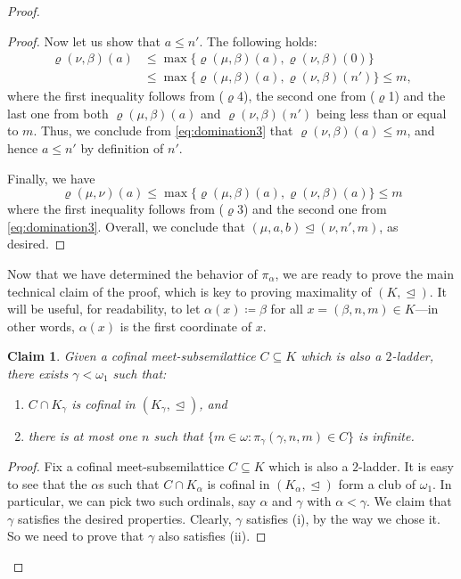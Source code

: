 \documentclass[]{amsart}
\newtheorem{claim}{Claim}[theorem]
\theoremstyle{definition}
\theoremstyle{remark}
\begin{document}
\begin{proof}
\begin{proof}
Now let us show that $a \le n'$. The following holds:
\begin{equation}\label{eq:domination3}
\begin{split}
\varrho(\nu, \beta)(a) &\le \max \{\varrho(\mu, \beta)(a), \varrho(\nu, \beta)(0)\}\\&\le \max \{\varrho(\mu, \beta)(a), \varrho(\nu, \beta)(n')\} \le m,
\end{split}
\end{equation}
where the first inequality follows from ($\varrho$4), the second one from ($\varrho$1) and the last one from both $\varrho(\mu, \beta)(a)$ and $\varrho(\nu, \beta)(n')$ being less than or equal to $m$.
Thus, we conclude from \eqref{eq:domination3} that $\varrho(\nu, \beta)(a) \le m$, and hence $a \le n'$ by definition of $n'$. 

Finally, we have
\[
\varrho(\mu, \nu)(a) \le \max \{\varrho(\mu, \beta)(a), \varrho(\nu, \beta)(a)\} \le m
\]
where the first inequality follows from ($\varrho$3) and the second one from \eqref{eq:domination3}. Overall, we conclude that $(\mu, a, b) \trianglelefteq (\nu, n', m)$, as desired.
\end{proof}

Now that we have determined the behavior of $\pi_\alpha$, we are ready to prove the main technical claim of the proof, which is key to proving maximality of $(K, \trianglelefteq)$. It will be useful, for readability, to let $\alpha(x) \coloneqq \beta$ for all $x = (\beta, n, m) \in K$---in other words, $\alpha(x)$ is the first coordinate of $x$.

\begin{claim}\label{thm:dominating:claim3}
Given a cofinal meet-subsemilattice $C\subseteq K$ which is also a $2$-ladder, there exists $\gamma < \omega_1$ such that:
\begin{enumerate}[label={\upshape (\roman*)}]
\item  $C \cap K_\gamma$ is cofinal in $(K_\gamma, \trianglelefteq)$, and
\item there is at most one $n$ such that $\{m \in \omega : \pi_\gamma (\gamma, n, m) \in C\}$ is infinite.
\end{enumerate}
\end{claim}
\begin{proof}
Fix a cofinal meet-subsemilattice $C \subseteq K$ which is also a $2$-ladder. It is easy to see that the $\alpha$s such that $C \cap K_\alpha$ is cofinal in $(K_\alpha, \trianglelefteq)$ form a club of $\omega_1$. In particular, we can pick two such ordinals, say $\alpha$ and $\gamma$ with $\alpha < \gamma$.  We claim that $\gamma$ satisfies the desired properties. Clearly, $\gamma$ satisfies (i), by the way we chose it. So we need to prove that  $\gamma$ also satisfies (ii).


\end{proof}
\end{proof}
\end{document}
